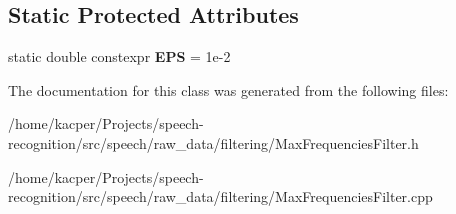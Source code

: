 \subsection*{Static Protected Attributes}
\begin{DoxyCompactItemize}
\item 
\hypertarget{classspeech_1_1raw__data_1_1filtering_1_1MaxFrequenciesFilter_ae05c85e27458890c3a53f26e0ea442bc}{static double constexpr {\bfseries E\+P\+S} = 1e-\/2}\label{classspeech_1_1raw__data_1_1filtering_1_1MaxFrequenciesFilter_ae05c85e27458890c3a53f26e0ea442bc}

\end{DoxyCompactItemize}


The documentation for this class was generated from the following files\+:\begin{DoxyCompactItemize}
\item 
/home/kacper/\+Projects/speech-\/recognition/src/speech/raw\+\_\+data/filtering/Max\+Frequencies\+Filter.\+h\item 
/home/kacper/\+Projects/speech-\/recognition/src/speech/raw\+\_\+data/filtering/Max\+Frequencies\+Filter.\+cpp\end{DoxyCompactItemize}
